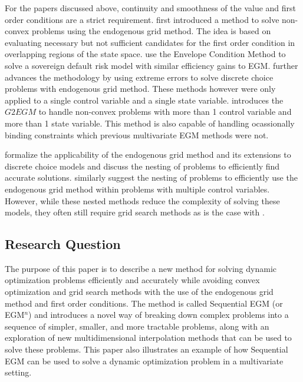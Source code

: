 \documentclass[\econtexRoot/SequentialEGM]{subfiles}
\begin{document}
For the papers discussed above, continuity and smoothness of the value and first order conditions are a strict requirement. \cite{Fella2014-my} first introduced a method to solve non-convex problems using the endogenous grid method. The idea is based on evaluating necessary but not sufficient candidates for the first order condition in overlapping regions of the state space. \cite{Arellano2016-wh} use the Envelope Condition Method to solve a sovereign default risk model with similar efficiency gains to EGM. \cite{Iskhakov2017-my} further advances the methodology by using extreme errors to solve discrete choice problems with endogenous grid method. These methods however were only applied to a single control variable and a single state variable. \cite{Druedahl2017-vn} introduces the $G2EGM$ to handle non-convex problems with more than 1 control variable and more than 1 state variable. This method is also capable of handling ocassionally binding constraints which previous multivariate EGM methods were not.

\cite{Clausen2020-zo} formalize the applicability of the endogenous grid method and its extensions to discrete choice models and discuss the nesting of problems to efficiently find accurate solutions.  \cite{Druedahl2021-wl} similarly suggest the nesting of problems to efficiently use the endogenous grid method within problems with multiple control variables. However, while these nested methods reduce the complexity of solving these models, they often still require grid search methods as is the case with \cite{Druedahl2021-wl}.


\subsection{Research Question} %


The purpose of this paper is to describe a new method for solving dynamic optimization problems efficiently and accurately while avoiding convex optimization and grid search methods with the use of the endogenous grid method and first order conditions. The method is called Sequential EGM (or EGM$^n$) and introduces a novel way of breaking down complex problems into a sequence of simpler, smaller, and more tractable problems, along with an exploration of new multidimensional interpolation methods that can be used to solve these problems. This paper also illustrates an example of how Sequential EGM can be used to solve a dynamic optimization problem in a multivariate setting.
\end{document}
